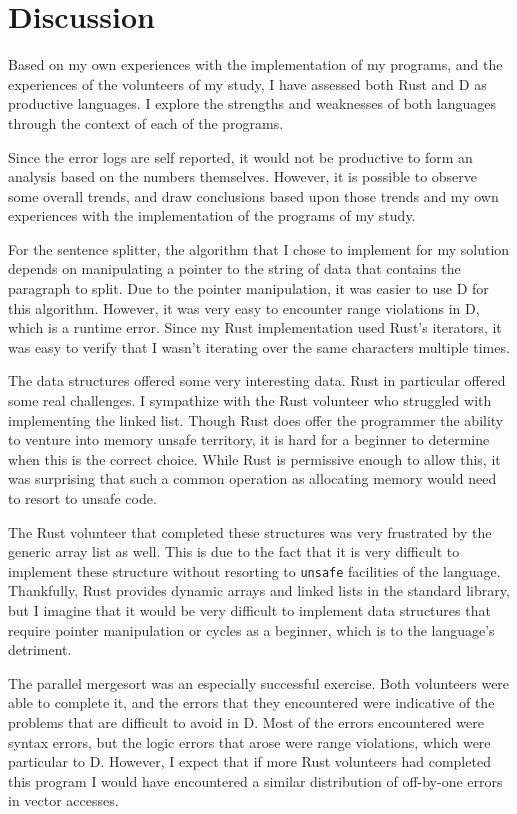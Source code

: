 \documentclass[finalcopy]{srpaper}
\begin{document}
\section{Discussion}

Based on my own experiences with the implementation of my programs, and the
experiences of the volunteers of my study, I have assessed both Rust and D as
productive languages. I explore the strengths and weaknesses of both languages
through the context of each of the programs.

Since the error logs are self reported, it would not be productive to form an
analysis based on the numbers themselves. However, it is possible to observe
some overall trends, and draw conclusions based upon those trends and my own
experiences with the implementation of the programs of my study.

For the sentence splitter, the algorithm that I chose to implement for my
solution depends on manipulating a pointer to the string of data that contains
the paragraph to split. Due to the pointer manipulation, it was easier to use D
for this algorithm. However, it was very easy to encounter range violations in
D, which is a runtime error. Since my Rust implementation used Rust's
iterators, it was easy to verify that I wasn't iterating over the same
characters multiple times.

The data structures offered some very interesting data. Rust in particular
offered some real challenges. I sympathize with the Rust volunteer who
struggled with implementing the linked list. Though Rust does offer the
programmer the ability to venture into memory unsafe territory, it is hard for
a beginner to determine when this is the correct choice. While Rust is
permissive enough to allow this, it was surprising that such a common
operation as allocating memory would need to resort to unsafe code.

The Rust volunteer that completed these structures was very frustrated by the
generic array list as well. This is due to the fact that it is very difficult
to implement these structure without resorting to \texttt{unsafe} facilities of
the language. Thankfully, Rust provides dynamic arrays and linked lists in the
standard library, but I imagine that it would be very difficult to implement
data structures that require pointer manipulation or cycles as a beginner,
which is to the language's detriment.

The parallel mergesort was an especially successful exercise. Both volunteers
were able to complete it, and the errors that they encountered were indicative
of the problems that are difficult to avoid in D. Most of the errors
encountered were syntax errors, but the logic errors that arose were range
violations, which were particular to D. However, I expect that if more Rust
volunteers had completed this program I would have encountered a similar
distribution of off-by-one errors in vector accesses.
\end{document}
